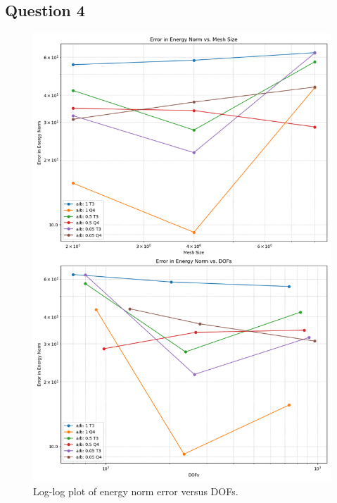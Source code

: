 \documentclass[twoside,twocolumn,10pt]{article}
\begin{document}
\subsection{Question 4}
\begin{figure}[!ht]
  \centering
  \includegraphics[width=1.\linewidth]{Q2_4/log_DOFs.png}
  \caption{Log-log plot of energy norm error versus DOFs.}
  \label{fig:logDOF_Q2_4}
\end{figure}
\end{document}
